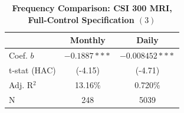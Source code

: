 \begin{table}[htbp]
\centering
\caption{\textbf{Frequency Comparison: CSI 300 MRI, Full-Control Specification $(3)$}}
\label{tab:freqcmp}
\begin{tabular}{lcc}
\toprule
 & Monthly & Daily \\
\midrule
Coef. $b$ & $-0.1887***$ & $-0.008452***$ \\
t-stat (HAC) & (-4.15) & (-4.71) \\
Adj. R$^2$ & 13.16\% & 0.720\% \\
N & 248 & 5039 \\
\bottomrule
\end{tabular}
\end{table}